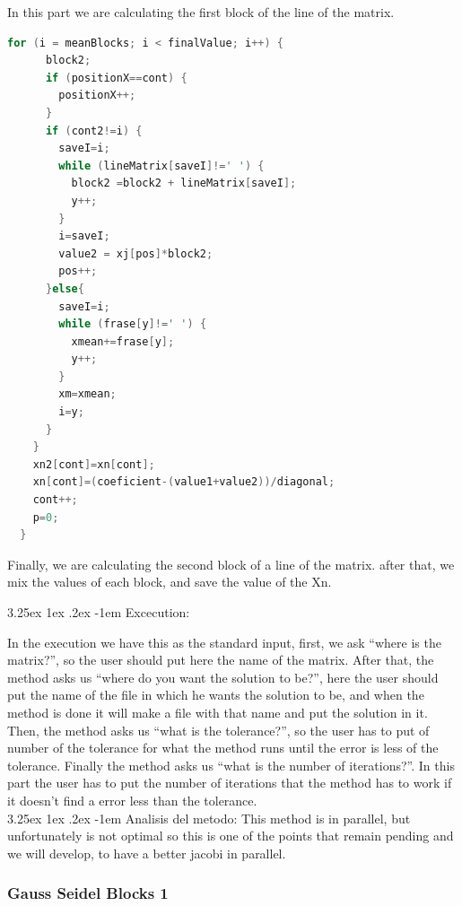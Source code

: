 \documentclass{article}
\makeatletter
\renewcommand\paragraph{\@startsection{paragraph}{5}{\z@}%
  {3.25ex \@plus1ex \@minus.2ex}%
  {-1em}%
  {\normalfont\normalsize\bfseries}}
\makeatother
\begin{document}
In this part we are calculating the first block of the line of the matrix.
\newpage

\begin{lstlisting}[language=C] 
    for (i = meanBlocks; i < finalValue; i++) {
      block2;
      if (positionX==cont) {
        positionX++;
      }
      if (cont2!=i) {
        saveI=i;
        while (lineMatrix[saveI]!=' ') {
          block2 =block2 + lineMatrix[saveI];
          y++;
        }
        i=saveI;
        value2 = xj[pos]*block2;
        pos++;
      }else{
        saveI=i;
        while (frase[y]!=' ') {
          xmean+=frase[y];
          y++;
        }
        xm=xmean;
        i=y;
      }
    }
    xn2[cont]=xn[cont];
    xn[cont]=(coeficient-(value1+value2))/diagonal;
    cont++;
    p=0;
  }

\end{lstlisting}

Finally, we are calculating the second block of a line of the matrix. after that, we mix the values of each block, and save the value of the Xn.
\newpage

\paragraph{Excecution:}
\hfill \break

In the execution we have this as the standard input,  first, we ask “where is the matrix?”, so the user should put here the name of the matrix. After that, the method asks us “where do you want the solution to be?”, here the user should put the name of the file in which he wants the solution to be, and when the method is done it will make a file with that name and put the solution in it. Then, the method asks us “what is the tolerance?”, so the user has to put of number of the tolerance for what the method runs until the error is less of the tolerance. Finally the method asks us “what is the number of iterations?”. In this part the user has to put the number of iterations that the method has to work if it doesn’t find a error less than the tolerance.\\


\paragraph{Analisis del metodo:}
\hfill \break
This method is in parallel, but unfortunately is not optimal so this is one of the points that remain pending and we will develop, to have a better jacobi in parallel.
\newpage
\subsubsection{Gauss Seidel Blocks 1}
\end{document}
